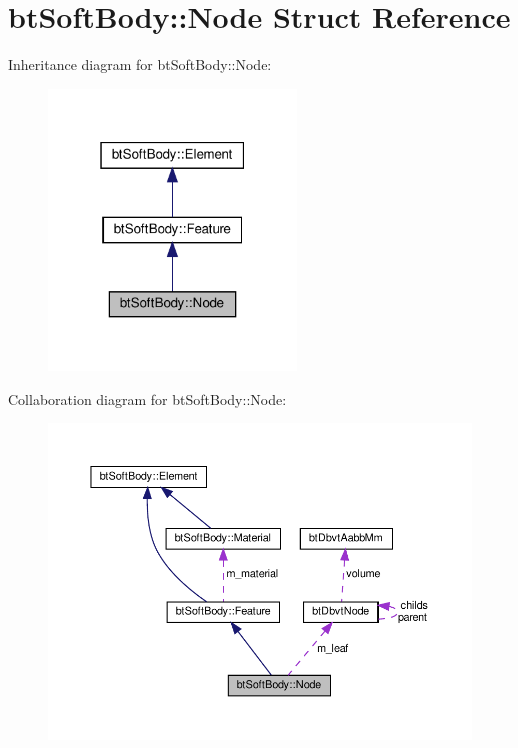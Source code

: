 \hypertarget{structbtSoftBody_1_1Node}{}\section{bt\+Soft\+Body\+:\+:Node Struct Reference}
\label{structbtSoftBody_1_1Node}


Inheritance diagram for bt\+Soft\+Body\+:\+:Node\+:
\nopagebreak
\begin{figure}[H]
\begin{center}
\leavevmode
\includegraphics[width=187pt]{structbtSoftBody_1_1Node__inherit__graph}
\end{center}
\end{figure}


Collaboration diagram for bt\+Soft\+Body\+:\+:Node\+:
\nopagebreak
\begin{figure}[H]
\begin{center}
\leavevmode
\includegraphics[width=350pt]{structbtSoftBody_1_1Node__coll__graph}
\end{center}
\end{figure}
